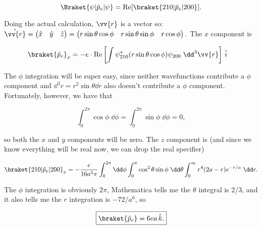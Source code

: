 \begin{parts}
  \begin{equation}
    \Braket{\psi | \hat{p}_e | \psi} = \mathrm{Re}[\braket{210 | \hat{p}_e | 200}].
  \end{equation}

  Doing the actual calculation, $\vv{r}$ is a vector so: $\hat{\vv{r}} = \begin{pmatrix}\hat{x} & \hat{y} & \hat{z}\end{pmatrix} = \begin{pmatrix}r\sin\theta\cos\phi & r\sin\theta\sin\phi & r\cos\phi\end{pmatrix}.$ The $x$ component is

  \begin{align}
    \braket{\hat{p}_e}_x &= -e \cdot \mathrm{Re}\left[ \int \psi^*_{210} (r\sin\theta\cos\phi) \psi_{200} \;\dd^3\vv{r} \right] \,\hat{i}
  \end{align}

  The $\phi$ integration will be super easy, since neither wavefunctions contribute a $\phi$ component and $\dd^3r = r^2 \sin\theta \dd r$ also doesn't contribute a $\phi$ component. Fortunately, however, we have that

  \begin{equation}
    \int_0^{2\pi} \cos\phi \;\dd\phi =     \int_0^{2\pi} \sin\phi \;\dd\phi = 0,
  \end{equation}

  so both the $x$ and $y$ components will be zero. The $z$ component is (and since we know everything will be real now, we can drop the real specifier)

  \begin{equation}
    \braket{210 | \hat{p}_e | 200}_x = - \frac{e}{16a^5\pi} \int_0^{2\pi} \dd\phi \int_0^\pi \cos^2\theta\sin\phi \;\dd\theta \int_0^\infty r^4(2a - r)e^{-r/a} \;\dd r.
  \end{equation}

  The $\phi$ integration is obviously $2\pi$, Mathematica tells me the $\theta$ integral is 2/3, and it also tells me the $r$ integration is $-72/a^6$, so

  \begin{equation}
    \boxed{\braket{\hat{p}_e} = 6ea \,\hat{k}.}
  \end{equation}
\end{parts}

